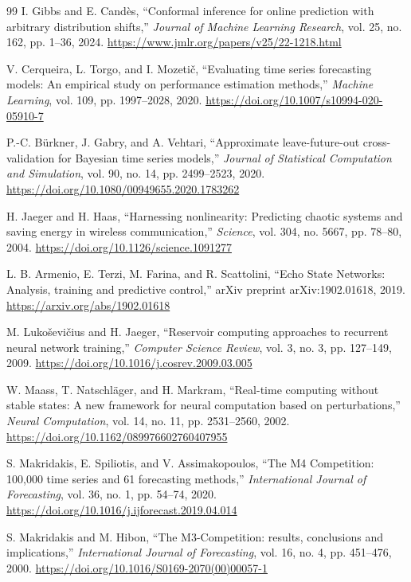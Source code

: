 \documentclass[review,number,sort&compress]{elsarticle}
\begin{document}
\begin{thebibliography}{99}
I. Gibbs and E. Cand\`es, ``Conformal inference for online prediction with arbitrary distribution shifts,'' \emph{Journal of Machine Learning Research}, vol. 25, no. 162, pp. 1--36, 2024. \url{https://www.jmlr.org/papers/v25/22-1218.html}

V. Cerqueira, L. Torgo, and I. Mozeti\v{c}, ``Evaluating time series forecasting models: An empirical study on performance estimation methods,'' \emph{Machine Learning}, vol. 109, pp. 1997--2028, 2020. \url{https://doi.org/10.1007/s10994-020-05910-7}

P.-C. B\"urkner, J. Gabry, and A. Vehtari, ``Approximate leave-future-out cross-validation for Bayesian time series models,'' \emph{Journal of Statistical Computation and Simulation}, vol. 90, no. 14, pp. 2499--2523, 2020. \url{https://doi.org/10.1080/00949655.2020.1783262}

H. Jaeger and H. Haas, ``Harnessing nonlinearity: Predicting chaotic systems and saving energy in wireless communication,'' \emph{Science}, vol. 304, no. 5667, pp. 78--80, 2004. \url{https://doi.org/10.1126/science.1091277}

L. B. Armenio, E. Terzi, M. Farina, and R. Scattolini, ``Echo State Networks: Analysis, training and predictive control,'' arXiv preprint arXiv:1902.01618, 2019. \url{https://arxiv.org/abs/1902.01618}

M. Luko\v{s}evi\v{c}ius and H. Jaeger, ``Reservoir computing approaches to recurrent neural network training,'' \emph{Computer Science Review}, vol. 3, no. 3, pp. 127--149, 2009. \url{https://doi.org/10.1016/j.cosrev.2009.03.005}

W. Maass, T. Natschl\"ager, and H. Markram, ``Real-time computing without stable states: A new framework for neural computation based on perturbations,'' \emph{Neural Computation}, vol. 14, no. 11, pp. 2531--2560, 2002. \url{https://doi.org/10.1162/089976602760407955}



S. Makridakis, E. Spiliotis, and V. Assimakopoulos, ``The M4 Competition: 100,000 time series and 61 forecasting methods,'' \emph{International Journal of Forecasting}, vol. 36, no. 1, pp. 54--74, 2020. \url{https://doi.org/10.1016/j.ijforecast.2019.04.014}

S. Makridakis and M. Hibon, ``The M3-Competition: results, conclusions and implications,'' \emph{International Journal of Forecasting}, vol. 16, no. 4, pp. 451--476, 2000. \url{https://doi.org/10.1016/S0169-2070(00)00057-1}


\end{thebibliography}
\end{document}

